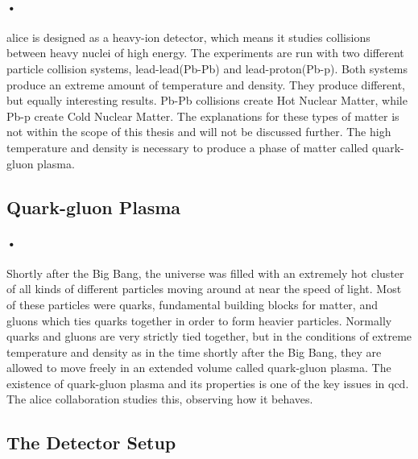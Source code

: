 \documentclass[a4paper, 12pt]{report}
\begin{document}
\paragraph{•}
\gls{alice} is designed as a heavy-ion detector, which means it studies collisions between heavy nuclei of high energy\cite{alice-home}.
The experiments are run with two different particle collision systems, lead-lead(Pb-Pb) and lead-proton(Pb-p).
Both systems produce an extreme amount of temperature and density.
They produce different, but equally interesting results.
Pb-Pb collisions create Hot Nuclear Matter, while Pb-p create Cold Nuclear Matter.
The explanations for these types of matter is not within the scope of this thesis and will not be discussed further.
The high temperature and density is necessary to produce a phase of matter called quark-gluon plasma.

\subsection{Quark-gluon Plasma}
\paragraph{•}
Shortly after the Big Bang, the universe was filled with an extremely hot cluster of all kinds of different particles moving around at near the speed of light\cite{alice-physics}.
Most of these particles were quarks, fundamental building blocks for matter, and gluons which ties quarks together in order to form heavier particles.
Normally quarks and gluons are very strictly tied together, but in the conditions of extreme temperature and density as in the time shortly after the Big Bang, they are allowed to move freely in an extended volume called quark-gluon plasma.
The existence of quark-gluon plasma and its properties is one of the key issues in \gls{qcd}.
The \gls{alice} collaboration studies this, observing how it behaves.

\subsection{The Detector Setup}
\end{document}
